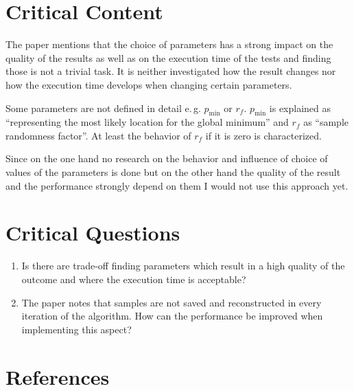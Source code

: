 \documentclass[oneside, notitlepage, twocolumn]{scrartcl}
\newcommand{\eg}{e.\,g.\xspace}
\begin{document}
\section{Critical Content}
The paper mentions that the choice of parameters has a strong impact on the quality of the results as well as on the execution time of the tests and finding those is not a trivial task.
It is neither investigated how the result changes nor how the execution time develops when changing certain parameters.\par
Some parameters are not defined in detail \eg{} \(p_\min\) or \(r_f\).
\(p_\min\) is explained as ``representing the most likely location for the global minimum'' and \(r_f\) as ``sample randomness factor''.
At least the behavior of \(r_f\) if it is zero is characterized.\par
Since on the one hand no research on the behavior and influence of choice of values of the parameters is done but on the other hand the quality of the result and the performance strongly depend on them I would not use this approach yet.

\section{Critical Questions}
\begin{enumerate}
    \item Is there are trade-off finding parameters which result in a high quality of the outcome and where the execution time is acceptable?
    \item The paper notes that samples are not saved and reconstructed in every iteration of the algorithm.
        How can the performance be improved when implementing this aspect?
\end{enumerate}

\printglossary[type=\acronymtype, title=List of Abbreviations]

\section{References}
\begingroup
\renewcommand{\section}[2]{}%
\nocite{*}
\printbibliography%
\endgroup
\end{document}
